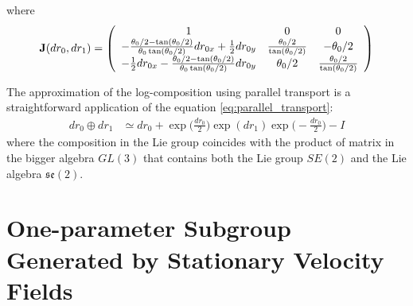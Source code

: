 where 
\begin{align*}
\mathbf{J}(dr_{0}, dr_{1})
=
\left (
\begin{array} {c c c}
1            &  0        &      0
\\
-\frac{\theta_0/2 - \tan(\theta_0/2)}{\theta_0\tan(\theta_0/2)}  dr_{0x} + \frac{1}{2}dr_{0y}       
&  \frac{\theta_0 /2}{\tan(\theta_0/2)} 
& - \theta_0/2 
\\
-  \frac{1}{2} dr_{0x} -\frac{\theta_0/2 - \tan(\theta_0/2)}{\theta_0\tan(\theta_0/2)} dr_{0y}       
& \theta_0/2 
&  \frac{\theta_0 /2}{\tan(\theta_0/2)}
\end{array}
\right )
\end{align*}

The approximation of the log-composition using parallel transport is a straightforward application of the equation \ref{eq:parallel_transport}: 
\begin{align}\label{eq:parallel_transport_se2}
dr_{0}\oplus dr_{1}
&\simeq
dr_{0}
+
\exp\big(\frac{dr_{0}}{2}\big)   
\exp(dr_{1}) 
\exp\big(-\frac{dr_{0}}{2}\big)
-
I
\end{align}
where the composition in the Lie group coincides with the product of matrix in the bigger algebra $GL(3)$ that contains both the Lie group $SE(2)$ and the Lie algebra $\mathfrak{se}(2)$.


\section{One-parameter Subgroup Generated by Stationary Velocity Fields}


